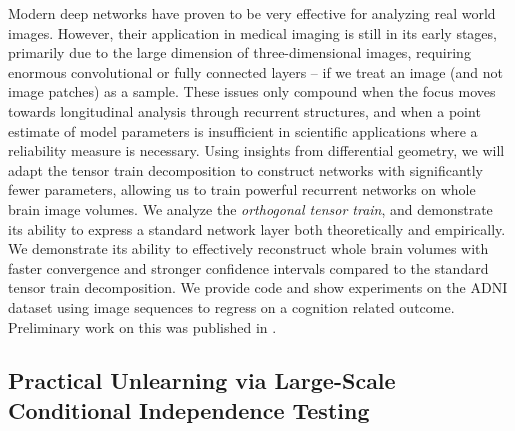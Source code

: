 Modern deep networks have proven to be very effective for analyzing real world images.
However, their application in medical imaging is still in its early stages,
primarily due to the large dimension of three-dimensional images, requiring enormous convolutional or fully connected layers --
if we treat an image (and not image patches) as a sample. 
These issues only compound when the focus moves towards longitudinal analysis
through recurrent structures, and when a point estimate of model parameters is insufficient 
in scientific applications where a reliability measure is necessary.
Using insights from differential geometry, 
we will adapt 
the tensor train decomposition to construct networks
with significantly fewer parameters,
allowing us to train powerful recurrent networks on whole brain image volumes. 
We analyze 
the \textit{orthogonal tensor train},
and demonstrate its ability to express a standard network layer both theoretically and empirically.
We 
demonstrate its ability to 
effectively reconstruct whole brain volumes
with faster convergence and stronger confidence intervals
compared to the standard tensor train decomposition. 
We provide code and show experiments on the ADNI dataset
using image sequences to regress on a cognition related outcome.
Preliminary work on this was published in \citep{ott}.

\subsection{Practical Unlearning via Large-Scale Conditional Independence Testing}

